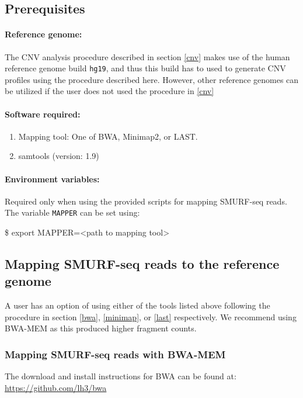 \documentclass[11pt]{article}
\newenvironment{cmd}
{\list{}{
    \parsep=0em
    \itemindent=17pt
    \listparindent=50pt
    \leftmargin=0in
    \rightmargin=0in
  }\item[] \ttfamily \$}
{\endlist}
\begin{document}
\subsection{Prerequisites}
\paragraph{Reference genome:} The CNV analysis procedure described in
section \ref{cnv} makes use of the human reference genome build
\texttt{hg19}, and thus this build has to used to generate CNV profiles
using the procedure described here. However, other reference genomes
can be utilized if the user does not used the procedure in \ref{cnv}

\paragraph{Software required:}
\begin{enumerate}
  \item Mapping tool: One of BWA, Minimap2, or LAST.
  \item samtools \cite{li2009sequence} (version: 1.9)
\end{enumerate}

\paragraph{Environment variables:}
Required only when using the provided scripts for mapping SMURF-seq reads.
The variable \texttt{MAPPER} can be set using:
\begin{cmd}
  export MAPPER=<path to mapping tool>
\end{cmd}


\subsection{Mapping SMURF-seq reads to the reference genome}

A user has an option of using either of the tools listed above following
the procedure in section \ref{bwa}, \ref{minimap}, or \ref{last}
respectively. We recommend using BWA-MEM as this produced higher
fragment counts.

\subsubsection{Mapping SMURF-seq reads with BWA-MEM}
The download and install instructions for BWA can be found at:
\url{https://github.com/lh3/bwa}
\end{document}
